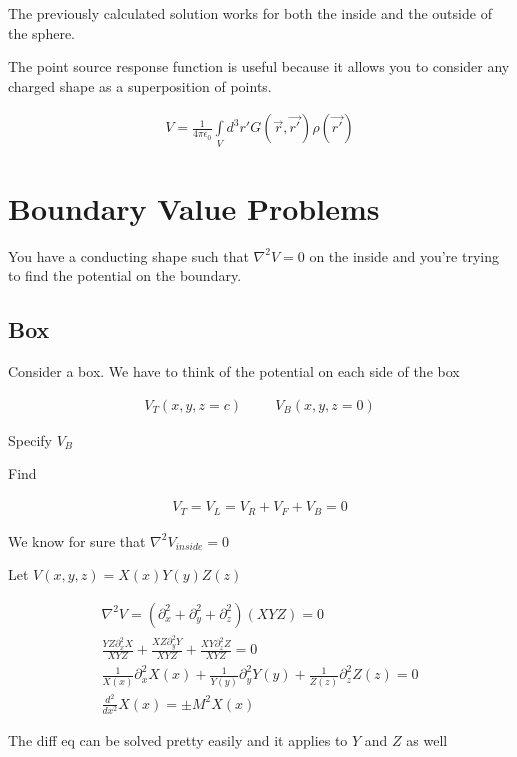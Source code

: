 \documentclass[fleqn]{report}
\newcommand{\hp}{\hspace{1cm}}
\newcommand{\del}{\partial}
\newcommand{\equations} [1] {
\begin{gather*}
#1
\end{gather*}
}
\begin{document}
The previously calculated solution works for both the inside 
and the outside of the sphere. 

The point source response function is useful because it allows you 
to consider any charged shape as a superposition of points. 
\equations{
    V = \frac{1}{4 \pi \epsilon_0}
    \int\limits_V d^3 r' G(\vec r, \vec{r'}) \rho(\vec{r'})
}

\section{Boundary Value Problems}

You have a conducting shape such that $\nabla^2 V = 0$ on the inside  
and you're trying to find the potential on the boundary. 

\subsection{Box}
Consider a box. 
We have to think of the potential on each side of the box
\equations{
    V_T(x, y, z = c)
    \hp
    V_B(x, y, z = 0)
}
Specify $V_B$

Find 
\equations{
    V_T = V_L = V_R + V_F + V_B = 0
}

We know for sure that $\nabla^2 V_{inside} = 0$

Let $V(x, y, z) = X(x)Y(y)Z(z)$
\equations{
    \nabla^2 V = 
    (\del_x^2 + \del_y^2 + \del_z^2)
    (XYZ) = 0
    \\
    \frac{YZ \del_x^2 X}{XYZ}
    +
    \frac{XZ \del_y^2 Y}{XYZ}
    +
    \frac{XY \del_z^2 Z}{XYZ}
    =
    0
    \\
    \frac{1}{X(x)} \del_x^2 X(x)
    +
    \frac{1}{Y(y)} \del_y^2 Y(y)
    +
    \frac{1}{Z(z)} \del_z^2 Z(z)
    = 0
    \\
    \frac{d^2}{dx^2} X(x) = \pm M^2 X(x)
}
The diff eq can be solved pretty easily and it applies to $Y$ and $Z$ as well 
\end{document}
